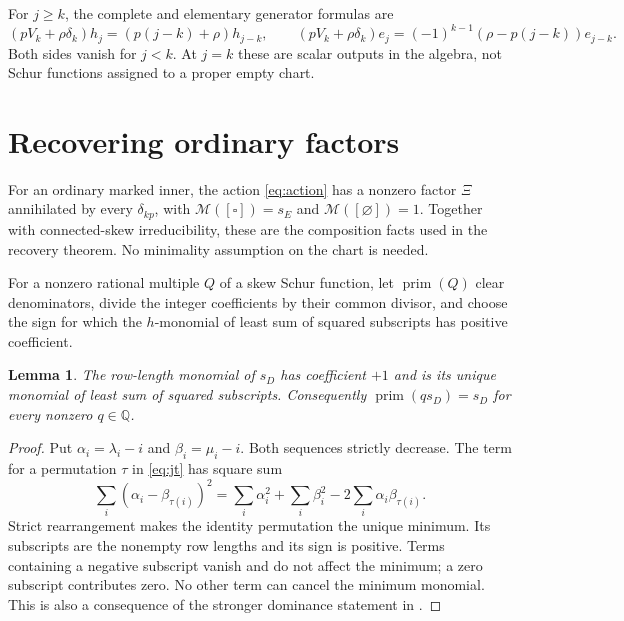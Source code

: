 \documentclass[11pt,a4paper]{amsart}
\numberwithin{equation}{section}
\theoremstyle{plain}
\newtheorem{lemma}[theorem]{Lemma}
\theoremstyle{definition}
\newcommand{\Q}{\mathbb Q}
\begin{document}
For \(j\ge k\), the complete and elementary generator formulas are
\[
 (pV_k+\rho\delta_k)h_j=(p(j-k)+\rho)h_{j-k},\qquad
 (pV_k+\rho\delta_k)e_j=(-1)^{k-1}(\rho-p(j-k))e_{j-k}.
\]
Both sides vanish for \(j<k\).  At \(j=k\) these are scalar outputs in the algebra, not Schur functions assigned to a proper empty chart.

\section{Recovering ordinary factors}\label{sec:extraction}

For an ordinary marked inner, the action \eqref{eq:action} has a nonzero factor \(\Xi\) annihilated by every \(\delta_{kp}\), with \(\mathcal M([\square])=s_E\) and \(\mathcal M([\varnothing])=1\).  Together with connected-skew irreducibility, these are the composition facts used in the recovery theorem.  No minimality assumption on the chart is needed.

For a nonzero rational multiple \(Q\) of a skew Schur function, let \(\operatorname{prim}(Q)\) clear denominators, divide the integer coefficients by their common divisor, and choose the sign for which the \(h\)-monomial of least sum of squared subscripts has positive coefficient.

\begin{lemma}\label{lem:primitive}
The row-length monomial of \(s_D\) has coefficient \(+1\) and is its unique monomial of least sum of squared subscripts.  Consequently \(\operatorname{prim}(q s_D)=s_D\) for every nonzero \(q\in\Q\).
\end{lemma}
\begin{proof}
Put \(\alpha_i=\lambda_i-i\) and \(\beta_i=\mu_i-i\).  Both sequences strictly decrease.  The term for a permutation \(\tau\) in \eqref{eq:jt} has square sum
\begin{equation*}
 \sum_i(\alpha_i-\beta_{\tau(i)})^2
 =\sum_i\alpha_i^2+\sum_i\beta_i^2-2\sum_i\alpha_i\beta_{\tau(i)}.
\end{equation*}
Strict rearrangement makes the identity permutation the unique minimum.  Its subscripts are the nonempty row lengths and its sign is positive.  Terms containing a negative subscript vanish and do not affect the minimum; a zero subscript contributes zero.  No other term can cancel the minimum monomial.  This is also a consequence of the stronger dominance statement in \cite[Prop.~6.2(ii)]{Reiner2007Coincidences}.
\end{proof}
\end{document}
